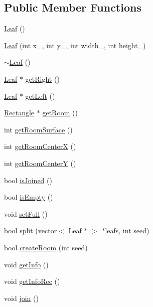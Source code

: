 \subsection*{Public Member Functions}
\begin{DoxyCompactItemize}
\item 
\hyperlink{class_leaf_a9e1781bba1de942f8d16e2df63d28a1a}{Leaf} ()
\item 
\hyperlink{class_leaf_ae1b9acf4a0bcabee47fd01910da6a53c}{Leaf} (int x\-\_\-, int y\-\_\-, int width\-\_\-, int height\-\_\-)
\item 
\hyperlink{class_leaf_a6d5e8ddc0b73cebb1311d4ae6eba75b1}{$\sim$\-Leaf} ()
\item 
\hyperlink{class_leaf}{Leaf} $\ast$ \hyperlink{class_leaf_ae23d3effcddd5b89fcc38acf2d9d0a51}{get\-Right} ()
\item 
\hyperlink{class_leaf}{Leaf} $\ast$ \hyperlink{class_leaf_a5f3b44e3aa906a7d39532c8667a5dd6c}{get\-Left} ()
\item 
\hyperlink{class_rectangle}{Rectangle} $\ast$ \hyperlink{class_leaf_a77b23315342ec3ca2dac7ea166371efd}{get\-Room} ()
\item 
int \hyperlink{class_leaf_ac17d8fe78b86a520cf52824fd4652d01}{get\-Room\-Surface} ()
\item 
int \hyperlink{class_leaf_a2fad27d8faf34df105194bdcc287618f}{get\-Room\-Center\-X} ()
\item 
int \hyperlink{class_leaf_ac264de1599d40fe23817ead8989603ab}{get\-Room\-Center\-Y} ()
\item 
bool \hyperlink{class_leaf_afd99e74265e756a52d7860ae21bf646b}{is\-Joined} ()
\item 
bool \hyperlink{class_leaf_ad2ecb787c4bca3f2599f0cff40d12fc0}{is\-Empty} ()
\item 
void \hyperlink{class_leaf_a2a2dc54e0c51f6cdaec477f695a26891}{set\-Full} ()
\item 
bool \hyperlink{class_leaf_abc40b0dddc39d8328210ade87d4392e1}{split} (vector$<$ \hyperlink{class_leaf}{Leaf} $\ast$ $>$ $\ast$leafs, int seed)
\item 
bool \hyperlink{class_leaf_ac033860475ea37207cc0e369acf4b448}{create\-Room} (int seed)
\item 
void \hyperlink{class_leaf_a12ab73d05dd7b333c655592fb96cfb46}{get\-Info} ()
\item 
void \hyperlink{class_leaf_a0e30b28d5e17877f89c5a637426aa7af}{get\-Info\-Rec} ()
\item 
void \hyperlink{class_leaf_a97b94902aab06ff739e38a0236a23c5e}{join} ()
\end{DoxyCompactItemize}


